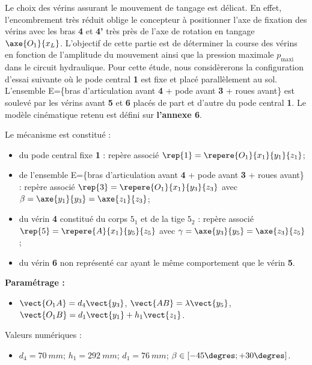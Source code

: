 Le choix des vérins assurant le mouvement de tangage est délicat. En effet, l’encombrement très réduit oblige le
concepteur à positionner l’axe de fixation des vérins avec les bras \textbf{4} et \textbf{4’} très près de l’axe de rotation en tangage $\axe{O_1}{x_L}$. L’objectif de cette partie est de déterminer la course des vérins en fonction de l’amplitude du mouvement ainsi que la pression maximale $p_{\text{maxi}}$ dans le circuit hydraulique. Pour cette étude, nous considèrerons la configuration d’essai suivante où le pode central \textbf{1} est fixe et placé parallèlement au sol. L’ensemble E=\{bras d’articulation avant \textbf{4} + pode avant \textbf{3} + roues avant\} est soulevé par les vérins avant \textbf{5} et \textbf{6} placés de part et d’autre du pode central \textbf{1}. Le modèle cinématique retenu est défini sur \textbf{l’annexe 6}.

Le mécanisme est constitué : 
\begin{itemize}
 \item du pode central fixe \textbf{1} : repère associé $\rep{1}=\repere{O_1}{x_1}{y_1}{z_1}$;
 \item de l'ensemble  E=\{bras d’articulation avant \textbf{4} + pode avant \textbf{3} + roues avant\} : repère associé $\rep{3}=\repere{O_1}{x_1}{y_3}{z_3}$ avec $\beta = \axe{y_1}{y_3} =\axe{z_1}{z_3}$;
 \item du vérin \textbf{4} constitué du corps \textbf{$5_1$} et de la tige \textbf{$5_2$} : repère associé $\rep{5}=\repere{A}{x_1}{y_5}{z_5}$ avec
  $\gamma = \axe{y_3}{y_5}= \axe{z_3}{z_5}$;
 \item du vérin \textbf{6} non représenté car ayant le même comportement que le vérin \textbf{5}.
\end{itemize}

\textbf{Paramétrage :}
\begin{itemize}
 \item $\vect{O_1 A}=d_4\vect{y_3}$, $\vect{AB}=\lambda\vect{y_5}$, $\vect{O_1 B}=d_1\vect{y_1}+h_1\vect{z_1}$.
\end{itemize}

Valeurs numériques : 
\begin{itemize}
 \item $d_4 =\SI{70}{mm}$; $h_1 =\SI{292}{mm}$; $d_1 =\SI{76}{mm}$; $\beta \in \left[ -45\degres;+30\degres\right]$.
\end{itemize}
\fi


